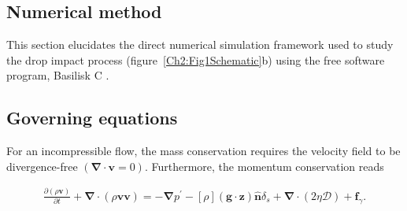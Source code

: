 \begin{subappendices}
	\section{Numerical method}\label{sec:NumMethods}
	This section elucidates the direct numerical simulation framework used to study the drop impact process (figure~\ref{Ch2:Fig1Schematic}b) using the free software program, Basilisk C \cite{basiliskpopinet1}. 
	
	\subsection{Governing equations}
	For an incompressible flow, the mass conservation requires the velocity field to be divergence-free $\left(\boldsymbol{\nabla\cdot v} = 0\right)$.  Furthermore, the momentum conservation  reads 
	
	\begin{align}
		\label{Ch2:EqnNS}
		\frac{\partial\left(\rho\boldsymbol{v}\right)}{\partial t} + \boldsymbol{\nabla\cdot}\left(\rho\boldsymbol{v}\boldsymbol{v}\right) = -\boldsymbol{\nabla} p^{\prime} - [\rho]\left(\boldsymbol{g}\cdot\boldsymbol{z}\right)\boldsymbol{\hat{n}}\delta_s + \boldsymbol{\nabla\cdot}\left(2\eta\boldsymbol{\mathcal{D}}\right) + \boldsymbol{f}_\gamma.
	\end{align}


\end{subappendices}
